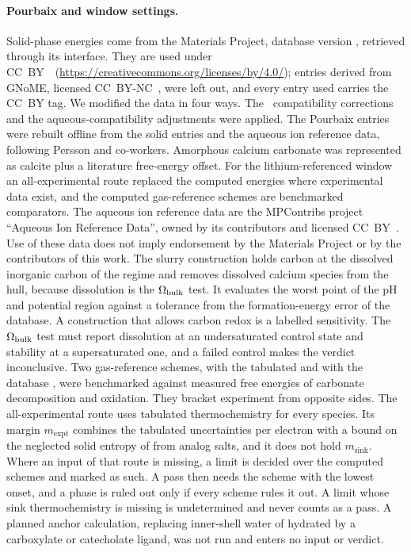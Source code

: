 \paragraph*{Pourbaix and window settings.}
Solid-phase energies come from the Materials Project\cite{jain2013commentary}, database version \NumMpDatabaseVersion, retrieved through its interface. %
They are used under CC~BY~\NumMpLicenceVersion\ (\url{https://creativecommons.org/licenses/by/4.0/}); entries derived from GNoME, licensed CC~BY-NC~\NumMpLicenceVersion, were left out, and every entry used carries the CC~BY tag. %
We modified the data in four ways. %
The \NumMpCorrectionScheme\ compatibility corrections and the aqueous-compatibility adjustments were applied. %
The Pourbaix entries were rebuilt offline from the solid entries and the aqueous ion reference data, following Persson and co-workers\cite{persson2012prediction}. %
Amorphous calcium carbonate was represented as calcite plus a literature free-energy offset. %
For the lithium-referenced window an all-experimental route replaced the computed energies where experimental data exist, and the computed gas-reference schemes are benchmarked comparators. %
The aqueous ion reference data are the MPContribs project ``Aqueous Ion Reference Data'', owned by its contributors and licensed CC~BY~\NumMpLicenceVersion. %
Use of these data does not imply endorsement by the Materials Project or by the contributors of this work. %
The slurry construction holds carbon at the dissolved inorganic carbon of the regime and removes dissolved calcium species from the hull, because dissolution is the $\Omega_\mathrm{bulk}$ test. %
It evaluates the worst point of the pH and potential region against a tolerance from the formation-energy error of the database\cite{stevanovic2012correcting,wang2021framework}. %
A construction that allows carbon redox is a labelled sensitivity. %
The $\Omega_\mathrm{bulk}$ test must report dissolution at an undersaturated control state and stability at a supersaturated one, and a failed control makes the verdict inconclusive. %
Two gas-reference schemes, with the tabulated and with the database , were benchmarked against measured free energies of carbonate decomposition and oxidation. %
They bracket experiment from opposite sides. %
The all-experimental route uses tabulated thermochemistry for every species\cite{rossini1971selected,rossini1981selected,allison2013nist}. %
Its margin $m_\mathrm{expt}$ combines the tabulated uncertainties per electron with a bound on the neglected solid entropy of  from analog salts, and it does not hold $m_\mathrm{sink}$. %
Where an input of that route is missing, a limit is decided over the computed schemes and marked as such. %
A pass then needs the scheme with the lowest onset, and a phase is ruled out only if every scheme rules it out. %
A limit whose sink thermochemistry is missing is undetermined and never counts as a pass. %
A planned anchor calculation, replacing inner-shell water of hydrated  by a carboxylate or catecholate ligand, was not run and enters no input or verdict. %

